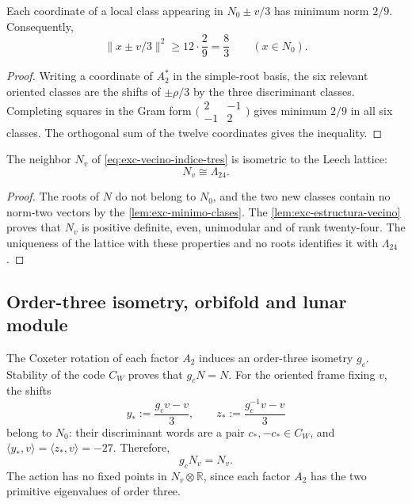 \begin{lemma}
\label{lem:exc-minimo-clases}
Each coordinate of a local class appearing in
\(N_0\pm v/3\) has minimum norm \(2/9\). Consequently,
\[
 \|x\pm v/3\|^2\ge12\cdot\frac29=\frac83
 \qquad(x\in N_0).
\]
\end{lemma}

\begin{proof}
Writing a coordinate of \(A_2^*\) in the simple-root basis, the
six relevant oriented classes are the shifts of
\(\pm\rho/3\) by the three discriminant classes. Completing squares in the
Gram form
\(\bigl(\begin{smallmatrix}2&-1\\-1&2\end{smallmatrix}\bigr)\)
gives minimum \(2/9\) in all six classes. The orthogonal sum of the twelve
coordinates gives the inequality.
\end{proof}

\begin{theorem}
\label{thm:exc-leech}
The neighbor \(N_v\) of \eqref{eq:exc-vecino-indice-tres} is isometric to the
Leech lattice:
\begin{equation}
 \boxed{N_v\cong\Lambda_{24}.}
 \label{eq:exc-leech}
\end{equation}
\end{theorem}

\begin{proof}
The roots of \(N\) do not belong to \(N_0\), and the two new classes
contain no norm-two vectors by the
\cref{lem:exc-minimo-clases}. The \cref{lem:exc-estructura-vecino} proves that
\(N_v\) is positive definite, even, unimodular and of rank twenty-four. The
uniqueness of the lattice with these properties and no roots identifies it with
\(\Lambda_{24}\) \citep{ConwaySloane1999}.
\end{proof}

\subsection{Order-three isometry, orbifold and lunar module}

The Coxeter rotation of each factor \(A_2\) induces an order-three isometry
\(g_c\). Stability of the code \(C_W\) proves that
\(g_cN=N\). For the oriented frame fixing \(v\), the shifts
\begin{equation}
 y_*:=\frac{g_cv-v}{3},
 \qquad
 z_*:=\frac{g_c^{-1}v-v}{3}
 \label{eq:exc-desplazamientos-vecino}
\end{equation}
belong to \(N_0\): their discriminant words are a pair
\(c_*,-c_*\in C_W\), and
\(\langle y_*,v\rangle=\langle z_*,v\rangle=-27\). Therefore,
\begin{equation}
 g_cN_v=N_v.
 \label{eq:exc-preservacion-vecino}
\end{equation}
The action has no fixed points in \(N_v\otimes\mathbb R\), since each
factor \(A_2\) has the two primitive eigenvalues of order three.

